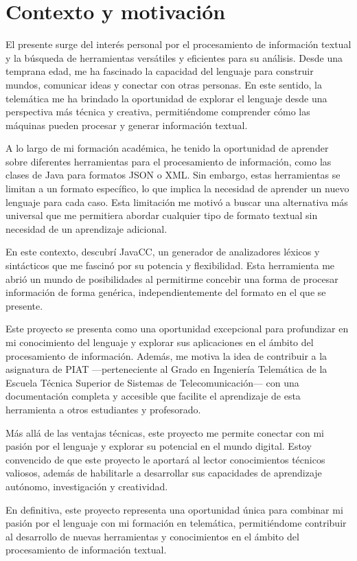 \section{Contexto y motivación}
El presente \pfg surge del interés personal por el procesamiento de información textual y la búsqueda de herramientas versátiles y eficientes para su análisis. Desde una temprana edad, me ha fascinado la capacidad del lenguaje para construir mundos, comunicar ideas y conectar con otras personas. En este sentido, la telemática me ha brindado la oportunidad de explorar el lenguaje desde una perspectiva más técnica y creativa, permitiéndome comprender cómo las máquinas pueden procesar y generar información textual.

A lo largo de mi formación académica, he tenido la oportunidad de aprender sobre diferentes herramientas para el procesamiento de información, como las clases de Java para formatos JSON o XML. Sin embargo, estas herramientas se limitan a un formato específico, lo que implica la necesidad de aprender un nuevo lenguaje para cada caso. Esta limitación me motivó a buscar una alternativa más universal que me permitiera abordar cualquier tipo de formato textual sin necesidad de un aprendizaje adicional.

En este contexto, descubrí JavaCC, un generador de analizadores léxicos y sintácticos que me fascinó por su potencia y flexibilidad\cite{javaccgithub}. Esta herramienta me abrió un mundo de posibilidades al permitirme concebir una forma de procesar información de forma genérica, independientemente del formato en el que se presente.

Este proyecto se presenta como una oportunidad excepcional para profundizar en mi conocimiento del lenguaje y explorar sus aplicaciones en el ámbito del procesamiento de información. Además, me motiva la idea de contribuir a la asignatura de PIAT ---perteneciente al Grado en Ingeniería Telemática de la Escuela Técnica Superior de Sistemas de Telecomunicación--- con una documentación completa y accesible que facilite el aprendizaje de esta herramienta a otros estudiantes y profesorado.

Más allá de las ventajas técnicas, este proyecto me permite conectar con mi pasión por el lenguaje y explorar su potencial en el mundo digital. Estoy convencido de que este proyecto le aportará al lector conocimientos técnicos valiosos, además de habilitarle a desarrollar sus capacidades de aprendizaje autónomo, investigación y creatividad. 

En definitiva, este proyecto representa una oportunidad única para combinar mi pasión por el lenguaje con mi formación en telemática, permitiéndome contribuir al desarrollo de nuevas herramientas y conocimientos en el ámbito del procesamiento de información textual.

